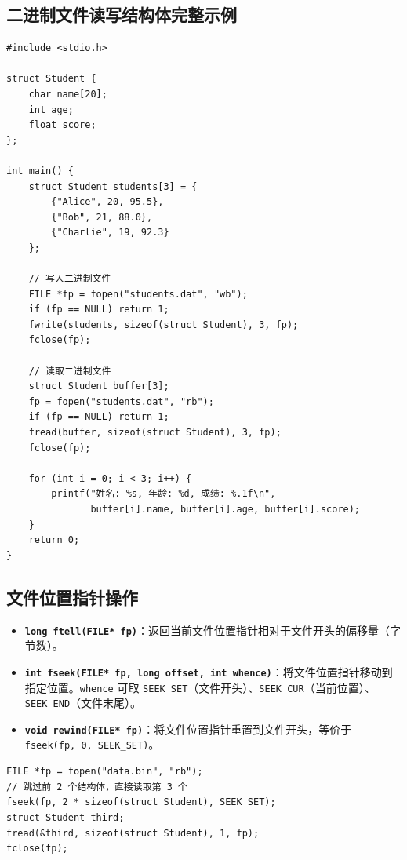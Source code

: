 \subsection{二进制文件读写结构体完整示例}

\begin{lstlisting}[caption={二进制文件读写结构体数组}]
#include <stdio.h>

struct Student {
    char name[20];
    int age;
    float score;
};

int main() {
    struct Student students[3] = {
        {"Alice", 20, 95.5},
        {"Bob", 21, 88.0},
        {"Charlie", 19, 92.3}
    };
    
    // 写入二进制文件
    FILE *fp = fopen("students.dat", "wb");
    if (fp == NULL) return 1;
    fwrite(students, sizeof(struct Student), 3, fp);
    fclose(fp);
    
    // 读取二进制文件
    struct Student buffer[3];
    fp = fopen("students.dat", "rb");
    if (fp == NULL) return 1;
    fread(buffer, sizeof(struct Student), 3, fp);
    fclose(fp);
    
    for (int i = 0; i < 3; i++) {
        printf("姓名: %s, 年龄: %d, 成绩: %.1f\n",
               buffer[i].name, buffer[i].age, buffer[i].score);
    }
    return 0;
}
\end{lstlisting}

\subsection{文件位置指针操作}

\begin{itemize}
    \item \textbf{\texttt{long ftell(FILE* fp)}}：返回当前文件位置指针相对于文件开头的偏移量（字节数）。
    \item \textbf{\texttt{int fseek(FILE* fp, long offset, int whence)}}：将文件位置指针移动到指定位置。\texttt{whence} 可取 \texttt{SEEK\_SET}（文件开头）、\texttt{SEEK\_CUR}（当前位置）、\texttt{SEEK\_END}（文件末尾）。
    \item \textbf{\texttt{void rewind(FILE* fp)}}：将文件位置指针重置到文件开头，等价于 \texttt{fseek(fp, 0, SEEK\_SET)}。
\end{itemize}

\begin{lstlisting}[caption={fseek 随机访问示例}]
FILE *fp = fopen("data.bin", "rb");
// 跳过前 2 个结构体，直接读取第 3 个
fseek(fp, 2 * sizeof(struct Student), SEEK_SET);
struct Student third;
fread(&third, sizeof(struct Student), 1, fp);
fclose(fp);
\end{lstlisting}

